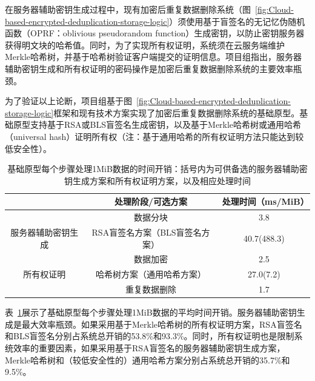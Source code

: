 在服务器辅助密钥生成过程中，现有加密后重复数据删除系统（图~\ref{fig:Cloud-based-encrypted-deduplication-storage-logic}）须使用基于盲签名\cite{armknecht15,keelveedhi2013DupLESS}的无记忆伪随机函数（OPRF：oblivious pseudorandom function）生成密钥\cite{keelveedhi2013DupLESS}，以防止密钥服务器获得明文块的哈希值。同时，为了实现所有权证明，系统须在云服务端维护Merkle哈希树，并基于哈希树验证客户端提交的证明信息\cite{halevi2011proofs}。项目组指出，服务器辅助密钥生成和所有权证明的密码操作是加密后重复数据删除系统的主要效率瓶颈。

为了验证以上论断，项目组基于图~\ref{fig:Cloud-based-encrypted-deduplication-storage-logic}框架和现有技术方案实现了加密后重复数据删除系统的基础原型。基础原型支持基于RSA\cite{keelveedhi2013DupLESS}或BLS\cite{armknecht15}盲签名生成密钥，以及基于Merkle哈希树\cite{halevi2011proofs}或通用哈希（universal hash）\cite{xu2013weak}证明所有权（注：基于通用哈希的所有权证明方法\cite{xu2013weak}只能达到较低安全性）。


\begin{table}[!htb]
    \small
    \centering
    \begin{tabular}{@{}ccc@{}}
    \toprule
                           & 处理阶段/可选方案          & 处理时间（ms/MiB） \\ \midrule
                           & 数据分块               & 3.8          \\
    服务器辅助密钥生成              & RSA盲签名方案（BLS盲签名方案） & 40.7(488.3)  \\
    \multirow{3}{*}{所有权证明} & 数据加密               & 2.5          \\
                           & 哈希树方案（通用哈希方案）      & 27.0(7.2)    \\
                           & 重复数据删除             & 1.7          \\ \bottomrule
    \end{tabular}
    \caption{基础原型每个步骤处理1MiB数据的时间开销：括号内为可供备选的服务器辅助密钥生成方案和所有权证明方案，以及相应处理时间}
    \label{tab:intro-bottleneck}
\end{table}

表~\ref{tab:intro-bottleneck}展示了基础原型每个步骤处理1MiB数据的平均时间开销。服务器辅助密钥生成是最大效率瓶颈。如果采用基于Merkle哈希树的所有权证明方案，RSA盲签名和BLS盲签名分别占系统总开销的53.8\%和93.3\%。同时，所有权证明也是限制系统效率的重要因素，如果采用基于RSA盲签名的服务器辅助密钥生成方案，Merkle哈希树和（较低安全性的）通用哈希方案分别占系统总开销的35.7\%和9.5\%。

